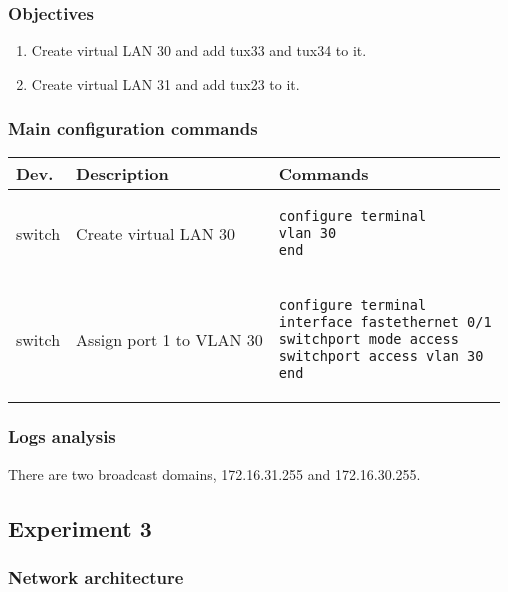 \documentclass[a4paper, 11pt]{report}
\begin{document}
\subsubsection{Objectives} \label{sec:Obj2}

\begin{enumerate}
    \item Create virtual LAN 30 and add tux33 and tux34 to it.
    \item Create virtual LAN 31 and add tux23 to it.
\end{enumerate}

\subsubsection{Main configuration commands} \label{sec:Com2}

\begin{tabular}{l | p{75mm} | l}
    \textbf{Dev.} & \textbf{Description}                                  & \textbf{Commands}                       \\ \hline
    switch        & Create virtual LAN 30                                 &
        \begin{lstlisting}[frame=none, numbers=none, language=sh]
configure terminal
vlan 30
end
        \end{lstlisting} \\
    switch        & Assign port 1 to VLAN 30                              & 
        \begin{lstlisting}[frame=none, numbers=none, language=sh]
configure terminal
interface fastethernet 0/1
switchport mode access
switchport access vlan 30
end
        \end{lstlisting} \\
\end{tabular}

\subsubsection{Logs analysis} \label{sec:Log2}

There are two broadcast domains, 172.16.31.255 and 172.16.30.255.

\subsection{Experiment 3} \label{sec:Exp3}
\subsubsection{Network architecture} \label{sec:Arc3}
\end{document}
